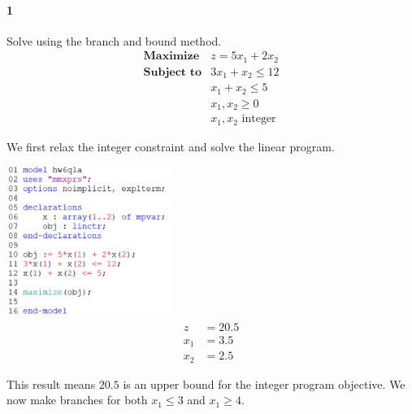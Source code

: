 \documentclass[12pt]{article}
\newenvironment{fullbox}{\begin{lrbox}{\savefullbox}\begin{minipage}{\dimexpr\textwidth-2\fboxsep\relax}}{\end{minipage}\end{lrbox}\begin{center}\framebox[\textwidth]{\usebox{\savefullbox}}\end{center}}
\newenvironment{pbox}[1][]{\begin{fullbox}\ifx#1\empty\else\paragraph{#1}\fi}{\end{fullbox}}
\theoremstyle{definition}
\begin{document}
\thispagestyle{title}


\begin{pbox}[1]
    Solve using the branch and bound method.
    \[\begin{array}{ll}
        \textbf{Maximize} & z = 5x_1 + 2x_2 \\
        \textbf{Subject to} & 3x_1 + x_2 \leq 12 \\
            & x_1 + x_2 \leq 5 \\
            & x_1, x_2 \geq 0 \\
            & x_1, x_2 \text{ integer}
    \end{array}\]
\end{pbox}

We first relax the integer constraint and solve the linear program.
\begin{center}
    \includegraphics[width=0.4\textwidth]{code1a.png}
    \begin{align*}
        z &= 20.5 \\
        x_1 &= 3.5 \\
        x_2 &= 2.5
    \end{align*}
\end{center}
This result means $20.5$ is an upper bound for the integer program objective. We now make branches for both $x_1 \leq 3$ and $x_1 \geq 4$.
\end{document}
